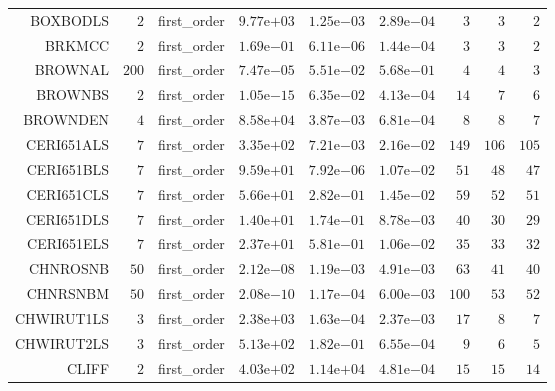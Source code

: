 \begin{longtable}{rrrrrrrrr}
BOXBODLS & \(     2\) & first\_order & \( 9.77\)e\(+03\) & \( 1.25\)e\(-03\) & \( 2.89\)e\(-04\) & \(     3\) & \(     3\) & \(     2\) \\
BRKMCC & \(     2\) & first\_order & \( 1.69\)e\(-01\) & \( 6.11\)e\(-06\) & \( 1.44\)e\(-04\) & \(     3\) & \(     3\) & \(     2\) \\
BROWNAL & \(   200\) & first\_order & \( 7.47\)e\(-05\) & \( 5.51\)e\(-02\) & \( 5.68\)e\(-01\) & \(     4\) & \(     4\) & \(     3\) \\
BROWNBS & \(     2\) & first\_order & \( 1.05\)e\(-15\) & \( 6.35\)e\(-02\) & \( 4.13\)e\(-04\) & \(    14\) & \(     7\) & \(     6\) \\
BROWNDEN & \(     4\) & first\_order & \( 8.58\)e\(+04\) & \( 3.87\)e\(-03\) & \( 6.81\)e\(-04\) & \(     8\) & \(     8\) & \(     7\) \\
CERI651ALS & \(     7\) & first\_order & \( 3.35\)e\(+02\) & \( 7.21\)e\(-03\) & \( 2.16\)e\(-02\) & \(   149\) & \(   106\) & \(   105\) \\
CERI651BLS & \(     7\) & first\_order & \( 9.59\)e\(+01\) & \( 7.92\)e\(-06\) & \( 1.07\)e\(-02\) & \(    51\) & \(    48\) & \(    47\) \\
CERI651CLS & \(     7\) & first\_order & \( 5.66\)e\(+01\) & \( 2.82\)e\(-01\) & \( 1.45\)e\(-02\) & \(    59\) & \(    52\) & \(    51\) \\
CERI651DLS & \(     7\) & first\_order & \( 1.40\)e\(+01\) & \( 1.74\)e\(-01\) & \( 8.78\)e\(-03\) & \(    40\) & \(    30\) & \(    29\) \\
CERI651ELS & \(     7\) & first\_order & \( 2.37\)e\(+01\) & \( 5.81\)e\(-01\) & \( 1.06\)e\(-02\) & \(    35\) & \(    33\) & \(    32\) \\
CHNROSNB & \(    50\) & first\_order & \( 2.12\)e\(-08\) & \( 1.19\)e\(-03\) & \( 4.91\)e\(-03\) & \(    63\) & \(    41\) & \(    40\) \\
CHNRSNBM & \(    50\) & first\_order & \( 2.08\)e\(-10\) & \( 1.17\)e\(-04\) & \( 6.00\)e\(-03\) & \(   100\) & \(    53\) & \(    52\) \\
CHWIRUT1LS & \(     3\) & first\_order & \( 2.38\)e\(+03\) & \( 1.63\)e\(-04\) & \( 2.37\)e\(-03\) & \(    17\) & \(     8\) & \(     7\) \\
CHWIRUT2LS & \(     3\) & first\_order & \( 5.13\)e\(+02\) & \( 1.82\)e\(-01\) & \( 6.55\)e\(-04\) & \(     9\) & \(     6\) & \(     5\) \\
CLIFF & \(     2\) & first\_order & \( 4.03\)e\(+02\) & \( 1.14\)e\(+04\) & \( 4.81\)e\(-04\) & \(    15\) & \(    15\) & \(    14\) \\

\end{longtable}

